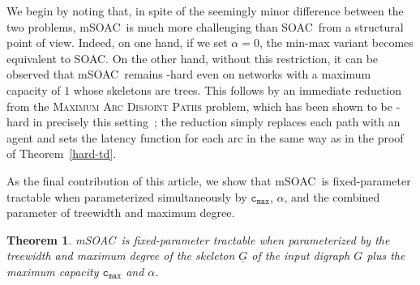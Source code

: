 \documentclass[letterpaper]{article} %
\newtheorem{theorem}{Theorem}
\newcommand{\problem}{{\sc SOAC}\xspace} %
\newcommand{\mproblem}{{\sc mSOAC}\xspace} %
\newcommand{\cmax}{\mathtt{c_{max}}}
\begin{document}
We begin by noting that, in spite of the seemingly minor difference between the two problems, \mproblem\ is much more challenging than \problem\ from a structural point of view. Indeed, on one hand, if we set $\alpha=0$, the min-max variant becomes equivalent to \problem. On the other hand, without this restriction, it can be observed that \mproblem\ remains \NP-hard even on networks with a maximum capacity of $1$ whose skeletons are trees. This follows by an immediate reduction from the \textsc{Maximum Arc Disjoint Paths} problem, which has been shown to be \NP-hard in precisely this setting~\cite{ErlebachJansen01}; the reduction simply replaces each path with an agent and sets the latency function for each arc in the same way as in the proof of Theorem~\ref{hard-td}. 

As the final contribution of this article, we show that \mproblem\ is fixed-parameter tractable when parameterized simultaneously by $\cmax$, $\alpha$, and the combined parameter of treewidth and maximum degree.

\begin{theorem}
\label{thm:msoacfpt}
\mproblem\ is fixed-parameter tractable when parameterized by the treewidth and maximum degree of the skeleton $\underline{G}$ of the input digraph $G$ plus the maximum capacity $\cmax$ and $\alpha$.
\end{theorem}
\end{document}
